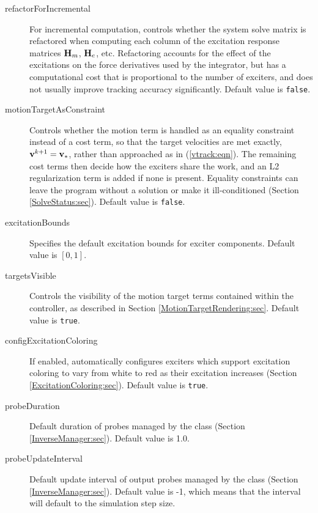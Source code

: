 \begin{description}
\item[refactorForIncremental]\mbox{}

For incremental computation, controls whether the system solve matrix is
refactored when computing each column of the excitation response matrices
${\bf H}_m$, ${\bf H}_e$, etc. Refactoring accounts for the effect of the excitations on
the force derivatives used by the integrator, but has a computational cost
that is proportional to the number of exciters, and does not usually improve
tracking accuracy significantly.  Default value is {\tt false}.

\item[motionTargetAsConstraint]\mbox{}

Controls whether the motion term is handled as an equality constraint instead
of a cost term, so that the target velocities are met exactly, ${\bf v}^{k+1} =
{\bf v}_*$, rather than approached as in (\ref{vtrack:eqn}). The remaining cost
terms then decide how the exciters share the work, and an L2 regularization
term is added if none is present. Equality constraints can leave the program
without a solution or make it ill-conditioned (Section \ref{SolveStatus:sec}).
Default value is {\tt false}.

\item[excitationBounds]\mbox{}

Specifies the default excitation bounds for exciter components.  Default value
is $[0, 1]$.

\item[targetsVisible]\mbox{}

Controls the visibility of the motion target terms contained within the
controller, as described in Section \ref{MotionTargetRendering:sec}. Default
value is {\tt true}.

\item[configExcitationColoring]\mbox{}

If enabled, automatically configures exciters which support excitation coloring
to vary from white to red as their excitation increases
(Section \ref{ExcitationColoring:sec}). Default value is {\tt true}.

\item[probeDuration]\mbox{}

Default duration of probes managed by the 
 class (Section \ref{InverseManager:sec}).
Default value is 1.0.

\item[probeUpdateInterval]\mbox{}

Default update interval of output probes managed by the
 class (Section \ref{InverseManager:sec}).
Default value is -1, which means that the interval will
default to the simulation step size.


\end{description}
